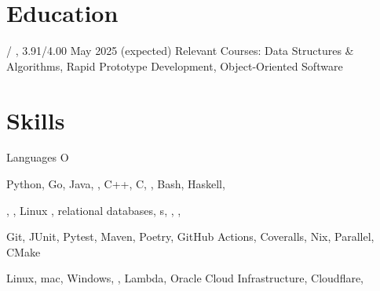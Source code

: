 \section{Education}
\begin{outline}
     / ,  3.91/4.00
    \hfill May 2025 (expected)
        \1 Relevant Courses: Data Structures \& Algorithms, Rapid Prototype Development, Object-Oriented Software
\end{outline}

\section{Skills}
\begin{labeling}{Languages O}
    \item [Languages] Python, Go, Java, , C++, C, , Bash, Haskell, \textsmaller{\LaTeX}
    \item [Concepts] , , Linux , relational databases, s, , , 
    \item [Tools] Git, JUnit, Pytest, Maven, Poetry, GitHub Actions, Coveralls, Nix,  Parallel, CMake
    \item [Platforms] Linux, mac, Windows, ,  Lambda, Oracle Cloud Infrastructure, Cloudflare, 
\end{labeling}

